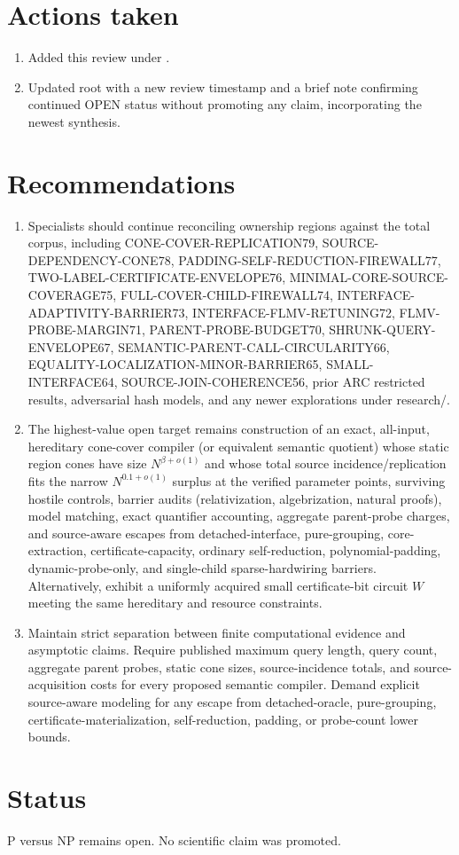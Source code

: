 \documentclass[11pt]{article}
\begin{document}
\section{Actions taken}
\begin{enumerate}
\item Added this review under .
\item Updated root  with a new review timestamp and a brief note confirming continued OPEN status without promoting any claim, incorporating the newest synthesis.
\end{enumerate}

\section{Recommendations}
\begin{enumerate}
\item Specialists should continue reconciling ownership regions against the total corpus, including CONE-COVER-REPLICATION79, SOURCE-DEPENDENCY-CONE78, PADDING-SELF-REDUCTION-FIREWALL77, TWO-LABEL-CERTIFICATE-ENVELOPE76, MINIMAL-CORE-SOURCE-COVERAGE75, FULL-COVER-CHILD-FIREWALL74, INTERFACE-ADAPTIVITY-BARRIER73, INTERFACE-FLMV-RETUNING72, FLMV-PROBE-MARGIN71, PARENT-PROBE-BUDGET70, SHRUNK-QUERY-ENVELOPE67, SEMANTIC-PARENT-CALL-CIRCULARITY66, EQUALITY-LOCALIZATION-MINOR-BARRIER65, SMALL-INTERFACE64, SOURCE-JOIN-COHERENCE56, prior ARC restricted results, adversarial hash models, and any newer explorations under research/.
\item The highest-value open target remains construction of an exact, all-input, hereditary cone-cover compiler (or equivalent semantic quotient) whose static region cones have size $N^{\beta+o(1)}$ and whose total source incidence/replication fits the narrow $N^{0.1+o(1)}$ surplus at the verified parameter points, surviving hostile controls, barrier audits (relativization, algebrization, natural proofs), model matching, exact quantifier accounting, aggregate parent-probe charges, and source-aware escapes from detached-interface, pure-grouping, core-extraction, certificate-capacity, ordinary self-reduction, polynomial-padding, dynamic-probe-only, and single-child sparse-hardwiring barriers. Alternatively, exhibit a uniformly acquired small certificate-bit circuit $W$ meeting the same hereditary and resource constraints.
\item Maintain strict separation between finite computational evidence and asymptotic claims. Require published maximum query length, query count, aggregate parent probes, static cone sizes, source-incidence totals, and source-acquisition costs for every proposed semantic compiler. Demand explicit source-aware modeling for any escape from detached-oracle, pure-grouping, certificate-materialization, self-reduction, padding, or probe-count lower bounds.
\end{enumerate}

\section{Status}
P versus NP remains open. No scientific claim was promoted.

\end{document}
